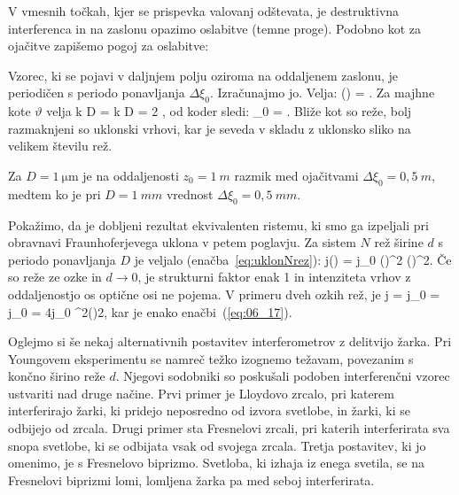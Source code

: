 V vmesnih točkah, kjer se prispevka valovanj odštevata, je destruktivna
interferenca in na zaslonu opazimo oslabitve (temne proge). Podobno kot za ojačitve
zapišemo pogoj za oslabitve:

Vzorec, ki se pojavi v daljnjem polju oziroma na oddaljenem zaslonu,
je periodičen s periodo ponavljanja $\Delta \xi_0$. Izračunajmo jo. Velja:
\beq
\Delta \left(\right) = \pi.
\label{eq:06_19}
\eeq
Za majhne kote $\vartheta$ velja 
\beq
k D \Delta \vartheta = k D  = 2 \pi,
\label{eq:06_20}
\eeq
od koder sledi:
\beq
\Delta \xi_0 = .
\label{eq:06_21}
\eeq
Bliže kot so reže, bolj razmaknjeni so uklonski vrhovi, kar je seveda v skladu
z uklonsko sliko na velikem številu rež. 

Za $D=1~\si{\micro\metre}$ je na oddaljenosti $z_0 = 1~\si{m}$ razmik med ojačitvami
$\Delta \xi_0 = 0,5~\si{m}$, medtem ko je pri $D = 1~\si{mm}$ 
vrednost $\Delta \xi_0 = 0,5~\si{mm}$. 

Pokažimo, da je dobljeni rezultat ekvivalenten ristemu, ki smo ga izpeljali pri
obravnavi Fraunhoferjevega uklona v petem poglavju. Za sistem $N$ rež širine $d$
s periodo ponavljanja $D$ je veljalo (enačba~\ref{eq:uklonNrez}):
\beq
j(\vartheta) = j_0 \left(\right)^2
\left(\right)^2\!\!.
\label{eq:06_22}
\eeq
Če so reže ze ozke in $d\to 0$, je strukturni faktor enak 1 in intenziteta vrhov z oddaljenostjo
os optične osi ne pojema. V primeru dveh ozkih rež, je 
\beq
j = j_0  = 
j_0 
 = 4j_0 \cos^2\left(\right){2},
\label{eq:06_23}
\eeq
kar je enako enačbi~(\ref{eq:06_17}).

\begin{remark}
Oglejmo si še nekaj alternativnih postavitev interferometrov z delitvijo žarka. Pri Youngovem
eksperimentu se namreč težko izognemo težavam, povezanim s končno širino reže $d$. Njegovi
sodobniki so poskušali podoben interferenčni vzorec ustvariti nad druge načine. Prvi primer
je Lloydovo zrcalo, pri katerem interferirajo žarki, ki pridejo neposredno od izvora svetlobe, 
in žarki, ki se odbijejo od zrcala. Drugi primer sta Fresnelovi zrcali, pri katerih interferirata
sva snopa svetlobe, ki se odbijata vsak od svojega zrcala. Tretja postavitev, ki jo omenimo,
je s Fresnelovo biprizmo. Svetloba, ki izhaja iz enega svetila, se na Fresnelovi biprizmi
lomi, lomljena žarka pa med seboj interferirata.
\end{remark}


